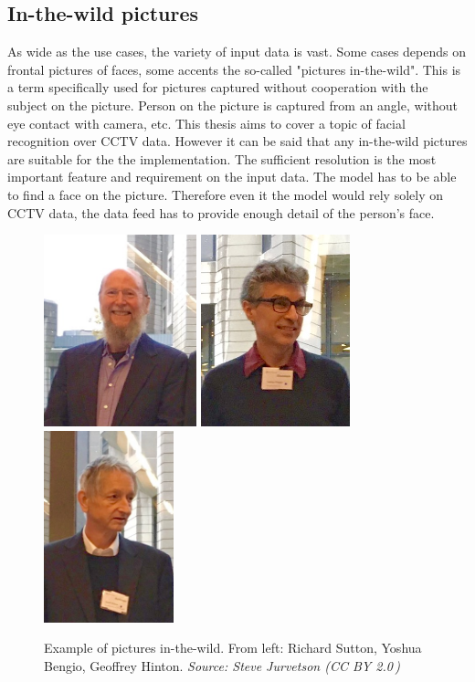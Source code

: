\subsection{In-the-wild pictures}

As wide as the use cases, the variety of input data is vast. Some cases depends on frontal pictures of faces, some accents the so-called "pictures in-the-wild". This is a term specifically used for pictures captured without cooperation with the subject on the picture. Person on the picture is captured from an angle, without eye contact with camera, etc. This thesis aims to cover a topic of facial recognition over CCTV data. However it can be said that any in-the-wild pictures are suitable for the the implementation. The sufficient resolution is the most important feature and requirement on the input data. The model has to be able to find a face on the picture. Therefore even it the model would rely solely on CCTV data, the data feed has to provide enough detail of the person's face.

\begin{figure}[ht]
    \centering
    \includegraphics[height=15em]{obrazky-figures/richard_sutton.jpg}
    \includegraphics[height=15em]{obrazky-figures/yoshua_bengio.jpg}
    \includegraphics[height=15em]{obrazky-figures/geoffrey_hinton.jpg}
    \caption[Example of pictures in{-}the{-}wild]{Example of pictures in{-}the{-}wild. From left: Richard Sutton, Yoshua Bengio, Geoffrey Hinton. \textit{Source: Steve Jurvetson (CC BY 2.0\,\footnotemark)}}
\end{figure}

